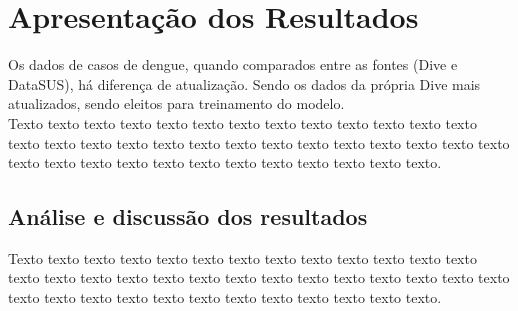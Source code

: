 \chapter{Apresentação dos Resultados}
\indent Os dados de casos de dengue, quando comparados entre as fontes (\acrshort{Dive} e \acrshort{DataSUS}), há diferença de atualização. Sendo os dados da própria \acrshort{Dive} mais atualizados, sendo eleitos para treinamento do modelo.\\

Texto texto texto texto texto texto texto texto texto texto texto texto texto texto texto texto texto texto texto texto texto texto texto texto texto texto texto texto texto texto texto texto texto texto texto texto texto texto texto.

\section{Análise e discussão dos resultados}

Texto texto texto texto texto texto texto texto texto texto texto texto texto texto texto texto texto texto texto texto texto texto texto texto texto texto texto texto texto texto texto texto texto texto texto texto texto texto texto.

